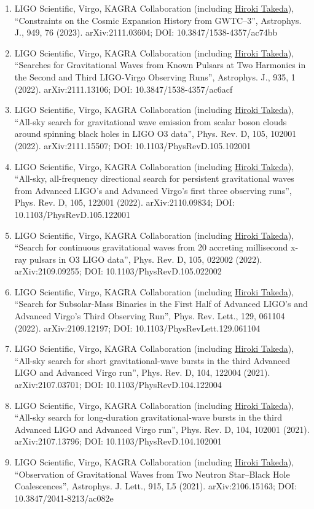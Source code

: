\documentclass[uplatex, 12pt]{article}
\begin{document}
\begin{enumerate}
\item LIGO Scientific, Virgo, KAGRA Collaboration (including \uline{Hiroki Takeda}), “Constraints on the Cosmic Expansion History from GWTC–3”, Astrophys. J., 949, 76 (2023). arXiv:2111.03604; DOI: 10.3847/1538-4357/ac74bb
\item LIGO Scientific, Virgo, KAGRA Collaboration (including \uline{Hiroki Takeda}), “Searches for Gravitational Waves from Known Pulsars at Two Harmonics in the Second and Third LIGO-Virgo Observing Runs”, Astrophys. J., 935, 1 (2022). arXiv:2111.13106; DOI: 10.3847/1538-4357/ac6acf
\item LIGO Scientific, Virgo, KAGRA Collaboration (including \uline{Hiroki Takeda}), “All-sky search for gravitational wave emission from scalar boson clouds around spinning black holes in LIGO O3 data”, Phys. Rev. D, 105, 102001 (2022). arXiv:2111.15507; DOI: 10.1103/PhysRevD.105.102001
\item LIGO Scientific, Virgo, KAGRA Collaboration (including \uline{Hiroki Takeda}), “All-sky, all-frequency directional search for persistent gravitational waves from Advanced LIGO's and Advanced Virgo's first three observing runs”, Phys. Rev. D, 105, 122001 (2022). arXiv:2110.09834; DOI: 10.1103/PhysRevD.105.122001
\item LIGO Scientific, Virgo, KAGRA Collaboration (including \uline{Hiroki Takeda}), “Search for continuous gravitational waves from 20 accreting millisecond
x-ray pulsars in O3 LIGO data”, Phys. Rev. D, 105, 022002 (2022). arXiv:2109.09255; DOI: 10.1103/PhysRevD.105.022002
\item LIGO Scientific, Virgo, KAGRA Collaboration (including \uline{Hiroki Takeda}), “Search for Subsolar-Mass Binaries in the First Half of Advanced LIGO's and Advanced Virgo's Third Observing Run”, Phys. Rev. Lett., 129, 061104 (2022). arXiv:2109.12197; DOI: 10.1103/PhysRevLett.129.061104
\item LIGO Scientific, Virgo, KAGRA Collaboration (including \uline{Hiroki Takeda}), “All-sky search for short gravitational-wave bursts in the third Advanced LIGO and Advanced Virgo run”, Phys. Rev. D, 104, 122004 (2021). arXiv:2107.03701; DOI: 10.1103/PhysRevD.104.122004
\item LIGO Scientific, Virgo, KAGRA Collaboration (including \uline{Hiroki Takeda}), “All-sky search for long-duration gravitational-wave bursts in the third Advanced LIGO and Advanced Virgo run”, Phys. Rev. D, 104, 102001 (2021). arXiv:2107.13796; DOI: 10.1103/PhysRevD.104.102001
\item LIGO Scientific, Virgo, KAGRA Collaboration (including \uline{Hiroki Takeda}), “Observation of Gravitational Waves from Two Neutron Star–Black Hole Coalescences”, Astrophys. J. Lett., 915, L5 (2021). arXiv:2106.15163; DOI: 10.3847/2041-8213/ac082e

\end{enumerate}
\end{document}
